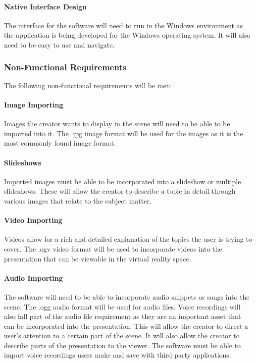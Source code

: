 \documentclass{article}
\begin{document}
		\paragraph{Native Interface Design}

		The interface for the software will need to run in the Windows environment as the application is being developed for the Windows operating system.
		It will also need to be easy to use and navigate.

	\subsubsection{Non-Functional Requirements}

	The following non-functional requirements will be met:

		\paragraph{Image Importing}

		Images the creator wants to display in the scene will need to be able to be imported into it.
		The .jpg image format will be used for the images as it is the most commonly found image format.

		\paragraph{Slideshows}

		Imported images must be able to be incorporated into a slideshow or multiple slideshows.
		These will allow the creator to describe a topic in detail through various images that relate to the subject matter.

		\paragraph{Video Importing}

		Videos allow for a rich and detailed explanation of the topics the user is trying to cover.
		The .ogv video format will be used to incorporate videos into the presentation that can be viewable in the virtual reality space.

		\paragraph{Audio Importing}

		The software will need to be able to incorporate audio snippets or songs into the scene.
		The .ogg audio format will be used for audio files.
		Voice recordings will also fall part of the audio file requirement as they are an important asset that can be incorporated into the presentation.
		This will allow the creator to direct a user's attention to a certain part of the scene.
		It will also allow the creator to describe parts of the presentation to the viewer.
		The software must be able to import voice recordings users make and save with third party applications.
\end{document}
